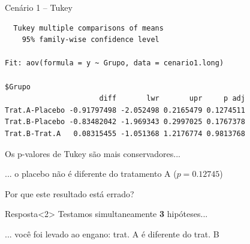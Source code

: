 \documentclass{beamer}
\begin{document}
\begin{frame}[fragile]
  \begin{exampleblock}{Cenário 1 -- Tukey}
    \scriptsize
\begin{verbatim}
  Tukey multiple comparisons of means
    95% family-wise confidence level

Fit: aov(formula = y ~ Grupo, data = cenario1.long)

$Grupo
                      diff       lwr       upr     p adj
Trat.A-Placebo -0.91797498 -2.052498 0.2165479 0.1274511
Trat.B-Placebo -0.83482042 -1.969343 0.2997025 0.1767378
Trat.B-Trat.A   0.08315455 -1.051368 1.2176774 0.9813768
\end{verbatim}
  \end{exampleblock}
  \begin{block}{}
    \small
    Os p-valores de Tukey são mais conservadores...

    \bigskip
    ... o placebo não é diferente do tratamento A ($p=0.12745$)
  \end{block}
\end{frame}


\begin{frame}
  \begin{center}
    Por que este resultado está errado?
  \end{center}

  \vfill
  \begin{block}{Resposta}<2>
    Testamos simultaneamente {\bf 3} hipóteses...

    \bigskip
    \small
    ... você foi levado ao engano: trat. A é diferente do trat. B
  \end{block}
\end{frame}
\end{document}
